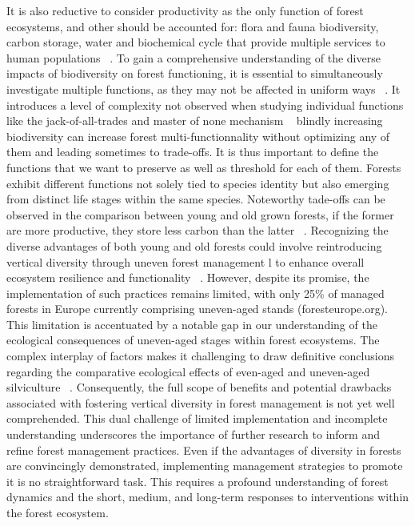 \documentclass{article}
\begin{document}
It is also reductive to consider productivity as the only function of forest ecosystems, and other should be accounted for: flora and fauna biodiversity, carbon storage, water and biochemical cycle that provide multiple services to human populations ~\autocite{SEE : Aerts}.
To gain a comprehensive understanding of the diverse impacts of biodiversity on forest functioning, it is essential to simultaneously investigate multiple functions, as they may not be affected in uniform ways ~\autocite{korboulewskyHowTreeDiversity2016}. It introduces a level of complexity not observed when studying individual functions like the jack-of-all-trades and master of none mechanism ~\autocite{vanderplasJackofalltradesEffectsDrive2016} blindly increasing biodiversity can increase forest multi-functionnality without optimizing any of them and leading sometimes to trade-offs. It is thus important to define the functions that we want to preserve as well as threshold for each of them. 
Forests exhibit different functions not solely tied to species identity but also emerging from distinct life stages within the same species. Noteworthy tade-offs can be observed in the comparison between young and old grown forests, if the former are more productive, they store less carbon than the latter ~\autocite{caspersenSuccessionalDiversityForest2001}. Recognizing the diverse advantages of both young and old forests could involve reintroducing vertical diversity through uneven forest management l to enhance overall ecosystem resilience and functionality ~\autocite{guldinRoleUnevenAgedSilviculture1996}. However, despite its promise, the implementation of such practices remains limited, with only 25\% of managed forests in Europe currently comprising uneven-aged stands (foresteurope.org).
This limitation is accentuated by a notable gap in our understanding of the ecological consequences of uneven-aged stages within forest ecosystems. The complex interplay of factors makes it challenging to draw definitive conclusions regarding the comparative ecological effects of even-aged and uneven-aged silviculture ~\autocite{noletComparingEffectsEven2018}. Consequently, the full scope of benefits and potential drawbacks associated with fostering vertical diversity in forest management is not yet well comprehended. This dual challenge of limited implementation and incomplete understanding underscores the importance of further research to inform and refine forest management practices.
Even if the advantages of diversity in forests are convincingly demonstrated, implementing management strategies to promote it is no straightforward task. This requires a profound understanding of forest dynamics and the short, medium, and long-term responses to interventions within the forest ecosystem.
\end{document}
